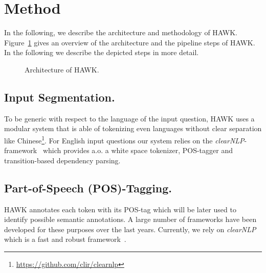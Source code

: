 \section{Method}
\label{chahawk:sec:method}

In the following, we describe the architecture and methodology of HAWK. 
Figure~\ref{fig:hawk_pipeline} gives an overview of the architecture and the pipeline steps of HAWK. In the following we describe the depicted steps in more detail.%

\begin{figure}[tb!]
\centering

\caption{Architecture of HAWK.}
\label{fig:hawk_pipeline}
\end{figure}

\subsection{Input Segmentation.} 
To be generic with respect to the language of the input question, HAWK uses a modular system that is able of tokenizing even languages without clear separation like Chinese\footnote{\url{https://github.com/clir/clearnlp}}.
For English input questions our system relies on the \emph{clearNLP}-framework~\cite{choi2011getting} which provides a.o. a white space tokenizer, POS-tagger and transition-based dependency parsing.

\subsection{Part-of-Speech (POS)-Tagging.} 
HAWK annotates each token with its POS-tag which will be later used to identify possible semantic annotations. 
A large number of frameworks have been developed for these purposes over the last years. 
Currently, we rely on \emph{clearNLP}~\cite{choi2011getting} which is a fast and robust framework~\cite{choi-palmer:2012:ACL2012short}.


